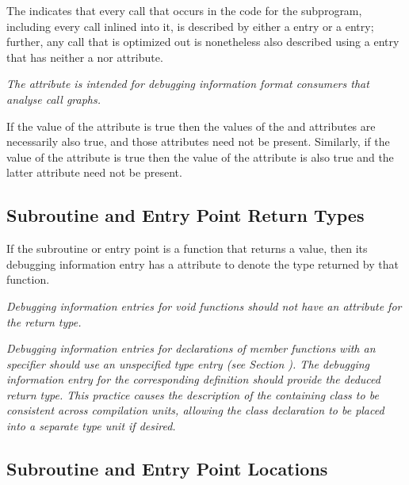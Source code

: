 The \DWATcallallsourcecallsDEFN{}
indicates that every call that occurs in the
code for the subprogram, including every call inlined into it, is described by either a 
\DWTAGcallsite{} entry or a \DWTAGinlinedsubroutine{} entry; further, any call
that is optimized out is nonetheless also described using a \DWTAGcallsite{} entry 
that has neither a \DWATcallpc{} nor \DWATcallreturnpc{} attribute.

\textit{The \DWATcallallsourcecallsNAME{} attribute is intended for debugging 
information format consumers that analyse call graphs.}

If the value of the \DWATcallallsourcecalls{} attribute is true then the values of the
\DWATcallallcalls{} and \DWATcallalltailcalls{} attributes are necessarily also true, and 
those attributes need not be present. Similarly, if the value of the 
\DWATcallallcalls{} attribute is true then the value of the \DWATcallalltailcalls{} 
attribute is also true and the latter attribute need not be present.

\subsection{Subroutine and Entry Point Return Types}
\label{chap:subroutineandentrypointreturntypes}

If 
\hypertarget{chap:DWATtypetypeofsubroutinereturn}{}
the subroutine or entry point 
is a function that returns a
value, then its debugging information entry has 
a \DWATtypeDEFN{} attribute 
to denote the type returned by that function.

\textit{Debugging information entries for 
 void functions should
not have an attribute for the return type.  }

\textit{Debugging information entries for declarations of  
member functions with an 
\autoreturntype{} specifier should use an unspecified type entry (see 
Section ). 
The debugging information entry for the corresponding definition
should provide the deduced return type.  This practice causes the description of
the containing class to be consistent across compilation units, allowing the class
declaration to be placed into a separate type unit if desired.}


\subsection{Subroutine and Entry Point Locations}
\label{chap:subroutineandentrypointlocations}

